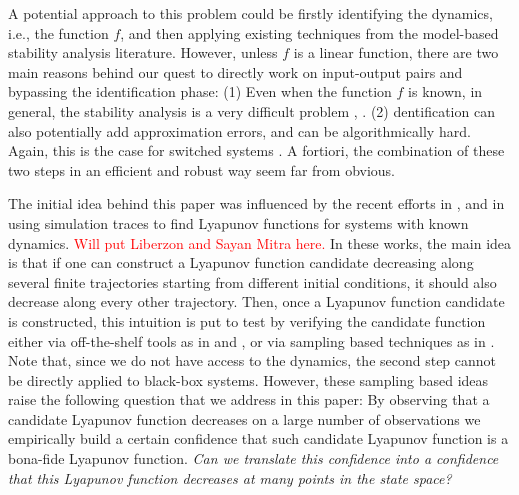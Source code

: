 A potential approach to this problem could be firstly identifying the dynamics, i.e., the function $f$, and then applying existing techniques from the model-based stability analysis literature. However, unless $f$ is a linear function, there are two main reasons behind our quest to directly work on input-output pairs and bypassing the identification phase: (1) Even when the function $f$ is known, in general, the stability analysis is a very difficult problem \cite{stabilityHard1}, \cite{stabilityHard2}. (2) dentification can also potentially add approximation errors, and can be algorithmically hard.  Again, this is the case for switched systems \cite{lauer}. A fortiori, the combination of these two steps in an efficient and robust way seem far from obvious.

The initial idea behind this paper was influenced by the recent efforts in \cite{topcu}, \cite{kapinski} and \cite{lazar} in using simulation traces to find Lyapunov functions for systems with known dynamics. \textcolor{red}{Will put Liberzon and Sayan Mitra here.} In these works, the main idea is that if one can construct a Lyapunov function candidate decreasing along several finite trajectories starting from different initial conditions, it should also decrease along every other trajectory. Then, once a Lyapunov function candidate is constructed, this intuition is put to test by verifying the candidate function either via off-the-shelf tools as in \cite{topcu} and \cite{kapinski}, or via sampling based techniques as in \cite{lazar}. Note that, since we do not have access to the dynamics, the second step cannot be directly applied to black-box systems. However, these sampling based ideas raise the following question that we address in this paper: By observing that a candidate Lyapunov function decreases on a large number of observations we empirically build a certain confidence that such candidate Lyapunov function is a bona-fide Lyapunov function. \emph{Can we translate this confidence into a confidence that this Lyapunov function decreases at many points in the state space?} 

